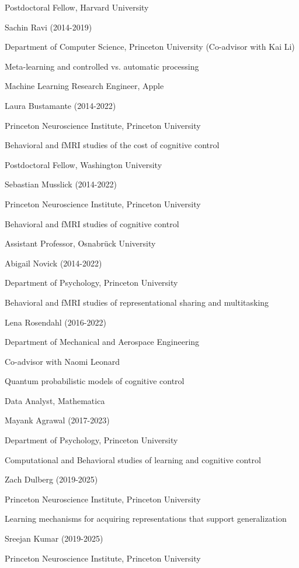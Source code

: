 \documentclass[10 pt]{article}
\begin{document}
Postdoctoral Fellow, Harvard University
    \medskip

Sachin Ravi (2014-2019)

Department of Computer Science, Princeton University (Co-advisor with Kai Li)

Meta-learning and controlled vs. automatic processing

Machine Learning Research Engineer, Apple
    \medskip

Laura Bustamante (2014-2022)

Princeton Neuroscience Institute, Princeton University

Behavioral and fMRI studies of the cost of cognitive control

Postdoctoral Fellow, Washington University
    \medskip

Sebastian Musslick (2014-2022)

Princeton Neuroscience Institute, Princeton University

Behavioral and fMRI studies of cognitive control

Assistant Professor, Osnabrück University
    \medskip

Abigail Novick (2014-2022)

Department of Psychology, Princeton University

Behavioral and fMRI studies of representational sharing and multitasking
    \medskip

Lena Rosendahl (2016-2022)

Department of Mechanical and Aerospace Engineering

Co-advisor with Naomi Leonard

Quantum probabilistic models of cognitive control

Data Analyst, Mathematica
    \medskip

Mayank Agrawal (2017-2023)

Department of Psychology, Princeton University

Computational and Behavioral studies of learning and cognitive control
    \medskip

Zach Dulberg (2019-2025)

Princeton Neuroscience Institute, Princeton University

Learning mechanisms for acquiring representations that support generalization
    \medskip

Sreejan Kumar (2019-2025)

Princeton Neuroscience Institute, Princeton University
\end{document}
